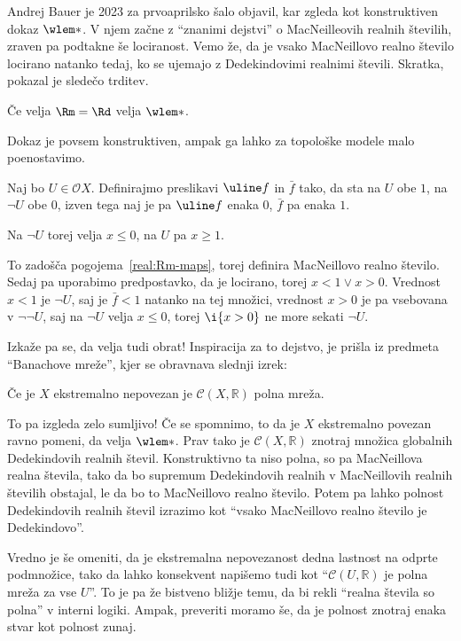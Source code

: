 Andrej Bauer je 2023 za prvoaprilsko šalo objavil, kar zgleda kot konstruktiven
dokaz \(\wlem*\). V njem začne z ``znanimi dejstvi'' o MacNeilleovih realnih
številih, zraven pa podtakne še lociranost. Vemo že, da je vsako MacNeillovo
realno število locirano natanko tedaj, ko se ujemajo z Dedekindovimi realnimi
števili.
Skratka, pokazal je sledečo trditev.
\begin{trditev}
  Če velja \(\Rm = \Rd\) velja \(\wlem*\).
\end{trditev}
\begin{dokaz}
  Dokaz je povsem konstruktiven, ampak ga lahko za topološke modele malo
  poenostavimo.

  Naj bo \(U ∈ 𝒪X\). Definirajmo preslikavi \(\uline f\) in \(\bar f\) tako, da
  sta na \(U\) obe \(1\), na \(¬U\) obe \(0\), izven tega naj je pa \(\uline f\)
  enaka \(0\), \(\bar f\) pa enaka \(1\).

  Na \(¬U\) torej velja \(x ≤ 0\), na \(U\) pa \(x ≥ 1\).

  To zadošča pogojema~\ref{real:Rm-maps}, torej definira MacNeillovo realno
  število.
  Sedaj pa uporabimo predpostavko, da je locirano, torej \(x < 1 ∨ x > 0\).
  Vrednost \(x < 1\) je \(¬U\), saj je \(\bar f < 1\) natanko na tej množici,
  vrednost \(x > 0\) je pa vsebovana v \(¬¬U\), saj na \(¬U\) velja \(x ≤ 0\),
  torej \(\i{x>0}\) ne more sekati \(¬U\). 
\end{dokaz}

Izkaže pa se, da velja tudi obrat! Inspiracija za to dejstvo, je prišla iz
predmeta ``Banachove mreže'', kjer se obravnava slednji izrek:
\begin{izrek}
  Če je \(X\) ekstremalno nepovezan je \(𝒞(X,ℝ)\) polna mreža.
\end{izrek}

To pa izgleda zelo sumljivo! Če se spomnimo, to da je \(X\) ekstremalno povezan
ravno pomeni, da velja \(\wlem*\). Prav tako je \(𝒞(X,ℝ)\) znotraj množica
globalnih Dedekindovih realnih števil. Konstruktivno ta niso polna, so pa
MacNeillova realna števila, tako da bo supremum Dedekindovih realnih v
MacNeillovih realnih številih obstajal, le da bo to MacNeillovo realno število.
Potem pa lahko polnost Dedekindovih realnih števil izrazimo kot ``vsako
MacNeillovo realno število je Dedekindovo''.

Vredno je še omeniti, da je ekstremalna nepovezanost dedna lastnost na odprte
podmnožice, tako da lahko konsekvent napišemo tudi kot ``\(𝒞(U,ℝ)\) je polna
mreža za vse \(U\)''. To je pa že bistveno bližje temu, da bi rekli ``realna
števila so polna'' v interni logiki. Ampak, preveriti moramo še, da je polnost
znotraj enaka stvar kot polnost zunaj. 

